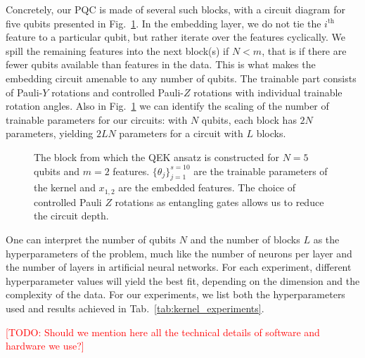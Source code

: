 \documentclass[twocolumn,superscriptaddress,nofootinbib]{revtex4-2}
\newcommand{\todo}[1]{\textcolor{red}{[TODO: #1]}}
\begin{document}
    Concretely, our PQC is made of several such blocks, with a circuit diagram for five qubits presented in Fig.~\ref{fig:circuit_layer}.
    In the embedding layer, we do not tie the $i^\text{th}$ feature to a particular qubit, but rather iterate over the features cyclically.
    We spill the remaining features into the next block(s) if $N<m$, that is if there are fewer qubits available than features in the data.
    This is what makes the embedding circuit amenable to any number of qubits.
    The trainable part consists of Pauli-$Y$ rotations and controlled Pauli-$Z$ rotations with individual trainable rotation angles.
    Also in Fig.~\ref{fig:circuit_layer} we can identify the scaling of the number of trainable parameters for our circuits: with $N$ qubits, each block has $2N$ parameters, yielding $2LN$ parameters for a circuit with $L$ blocks.
    
    \begin{figure}
        
        \caption{The block from which the \ac{QEK} ansatz is constructed for $N=5$ qubits and $m=2$ features. $\{\theta_j\}_{j=1}^{s=10}$ are the trainable parameters of the kernel and $x_{1,2}$ are the embedded features. The choice of controlled Pauli $Z$ rotations as entangling gates allows us to reduce the circuit depth.}
        \label{fig:circuit_layer}
    \end{figure}
    
    One can interpret the number of qubits $N$ and the number of blocks $L$ as the hyperparameters of the problem, much like the number of neurons per layer and the number of layers in artificial neural networks.
    For each experiment, different hyperparameter values will yield the best fit, depending on the dimension and the complexity of the data.
    For our experiments, we list both the hyperparameters used and results achieved in Tab.~\ref{tab:kernel_experiments}. 
    
    \todo{Should we mention here all the technical details of software and hardware we use?}
    
\end{document}
